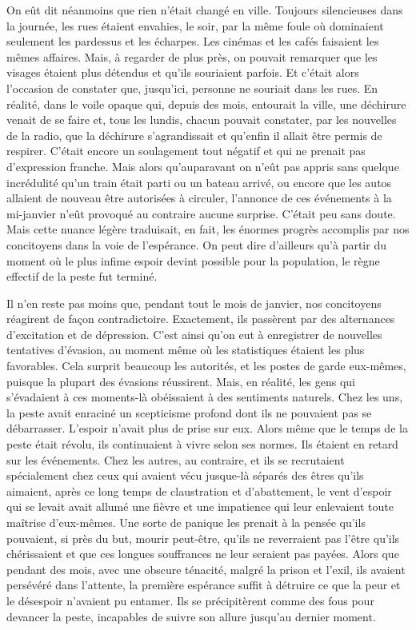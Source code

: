 \documentclass[french,twoside]{book} %
\begin{document}
On eût dit néanmoins que rien n’était changé en ville. Toujours silencieuses dans la journée, les rues étaient envahies, le soir, par la même foule où dominaient seulement les pardessus et les écharpes. Les cinémas et les cafés faisaient les mêmes affaires. Mais, à regarder de plus près, on pouvait remarquer que les visages étaient plus détendus et qu’ils souriaient parfois. Et c’était alors l’occasion de constater que, jusqu’ici, personne ne souriait dans les rues. En réalité, dans le voile opaque qui, depuis des mois, entourait la ville, une déchirure venait de se faire et, tous les lundis, chacun pouvait constater, par les nouvelles de la radio, que la déchirure s’agrandissait et qu’enfin il allait être permis de respirer. C’était encore un soulagement tout négatif et qui ne prenait pas d’expression franche. Mais alors qu’auparavant on n’eût pas appris sans quelque incrédulité qu’un train était parti ou un bateau arrivé, ou encore que les autos allaient de nouveau être autorisées à circuler, l’annonce de ces événements à la mi-janvier n’eût provoqué au contraire aucune surprise. C’était peu sans doute. Mais cette nuance légère traduisait, en fait, les énormes progrès accomplis par nos concitoyens dans la voie de l’espérance. On peut dire d’ailleurs qu’à partir du moment où le plus infime espoir devint possible pour la population, le règne effectif de la peste fut terminé.\par
Il n’en reste pas moins que, pendant tout le mois de janvier, nos concitoyens réagirent de façon contradictoire. Exactement, ils passèrent par des alternances d’excitation et de dépression. C’est ainsi qu’on eut à enregistrer de nouvelles tentatives d’évasion, au moment même où les statistiques étaient les plus favorables. Cela surprit beaucoup les autorités, et les postes de garde eux-mêmes, puisque la plupart des évasions réussirent. Mais, en réalité, les gens qui s’évadaient à ces moments-là obéissaient à des sentiments naturels. Chez les uns, la peste avait enraciné un scepticisme profond dont ils ne pouvaient pas se débarrasser. L’espoir n’avait plus de prise sur eux. Alors même que le temps de la peste était révolu, ils continuaient à vivre selon ses normes. Ils étaient en retard sur les événements. Chez les autres, au contraire, et ils se recrutaient spécialement chez ceux qui avaient vécu jusque-là séparés des êtres qu’ils aimaient, après ce long temps de claustration et d’abattement, le vent d’espoir qui se levait avait allumé une fièvre et une impatience qui leur enlevaient toute maîtrise d’eux-mêmes. Une sorte de panique les prenait à la pensée qu’ils pouvaient, si près du but, mourir peut-être, qu’ils ne reverraient pas l’être qu’ils chérissaient et que ces longues souffrances ne leur seraient pas payées. Alors que pendant des mois, avec une obscure ténacité, malgré la prison et l’exil, ils avaient persévéré dans l’attente, la première espérance suffit à détruire ce que la peur et le désespoir n’avaient pu entamer. Ils se précipitèrent comme des fous pour devancer la peste, incapables de suivre son allure jusqu’au dernier moment.\par
\end{document}
